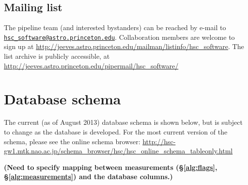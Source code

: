 \documentclass[12pt]{article}
\newcommand\tbd[1]{\textbf{\color{red}(#1)}}
\def\email#1{\href{mailto:#1}{\nolinkurl{#1}}}
\begin{document}
{\subsection{Mailing list}

The pipeline team (and interested bystanders) can be reached by e-mail to
\email{hsc_software@astro.princeton.edu}.  Collaboration members are welcome to sign up at
\url{http://jeeves.astro.princeton.edu/mailman/listinfo/hsc_software}.  The list archive is publicly
accessible, at \url{http://jeeves.astro.princeton.edu/pipermail/hsc_software/}


\clearpage




\appendix

\section{Database schema}
\label{sec:schema}

The current (as of August 2013) database schema is shown below, but is subject to change as the database is
developed.  For the most current version of the schema, please see the online schema browser:
\url{http://hsc-gw1.mtk.nao.ac.jp/schema_browser/hsc/hsc_online_schema_tableonly.html}

\tbd{Need to specify mapping between measurements (\S\ref{alg:flags}, \S\ref{alg:measurements}) and the
database columns.}

\tiny

}
\end{document}
